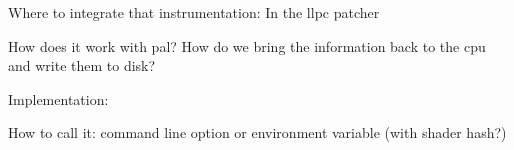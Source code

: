 \clearpage
{}
Where to integrate that instrumentation: In the llpc patcher

How does it work with pal?
How do we bring the information back to the cpu and write them to disk?

Implementation:

How to call it: command line option or environment variable (with shader hash?)